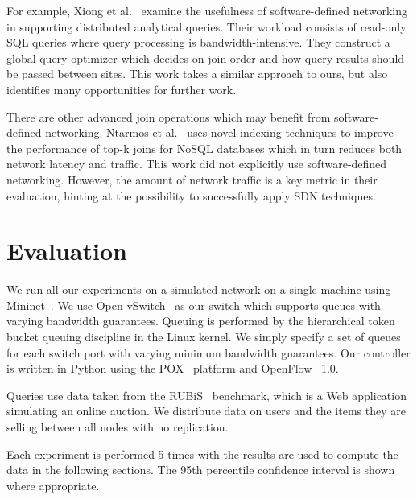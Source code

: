 \documentclass{acm_proc_article-sp}
\begin{document}
For example, Xiong et al.~\cite{Xiong2014} examine the usefulness of software-defined networking in supporting distributed analytical queries.
Their workload consists of read-only SQL queries where query processing is bandwidth-intensive.
They construct a global query optimizer which decides on join order and how query results should be passed between sites.
This work takes a similar approach to ours, but also identifies many opportunities for further work.

There are other advanced join operations which may benefit from software-defined networking.
Ntarmos et al.~\cite{Ntarmos2014} uses novel indexing techniques to improve the performance of top-k joins for NoSQL databases which in turn reduces both network latency and traffic.
This work did not explicitly use software-defined networking.
However, the amount of network traffic is a key metric in their evaluation, hinting at the possibility to successfully apply SDN techniques.

\section{Evaluation}

We run all our experiments on a simulated network on a single machine using Mininet~\cite{Lantz2010}.
We use Open vSwitch~\cite{Pfaff2009} as our switch which supports queues with varying bandwidth guarantees.
Queuing is performed by the hierarchical token bucket queuing discipline in the Linux kernel.
We simply specify a set of queues for each switch port with varying minimum bandwidth guarantees.
Our controller is written in Python using the POX~\cite{Gude2008} platform and OpenFlow~\cite{McKeown2008} 1.0.

Queries use data taken from the RUBiS~\cite{Cecchet2002} benchmark, which is a Web application simulating an online auction.
We distribute data on users and the items they are selling between all nodes with no replication.

Each experiment is performed 5 times with the results are used to compute the data in the following sections.
The 95th percentile confidence interval is shown where appropriate.
\end{document}
